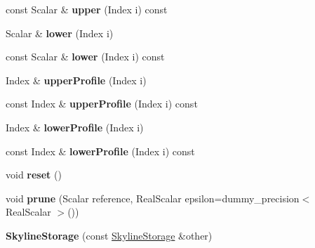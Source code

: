 \begin{DoxyCompactItemize}
const Scalar \& {\bfseries upper} (Index i) const
\item 
\mbox{\label{class_eigen_1_1_skyline_storage_a844f3b6e4223791e73f946aedd8ff04d}} 
Scalar \& {\bfseries lower} (Index i)
\item 
\mbox{\label{class_eigen_1_1_skyline_storage_ad65c2adb1faa0647e7874933f9a5e4b8}} 
const Scalar \& {\bfseries lower} (Index i) const
\item 
\mbox{\label{class_eigen_1_1_skyline_storage_a113fbc2bef6d7a61235d2fd36894bd5b}} 
Index \& {\bfseries upper\+Profile} (Index i)
\item 
\mbox{\label{class_eigen_1_1_skyline_storage_a395ccb86a4d455d7dc3fcf9513e64454}} 
const Index \& {\bfseries upper\+Profile} (Index i) const
\item 
\mbox{\label{class_eigen_1_1_skyline_storage_a1e9e0fc36cf307cebf3ef4d50bd2d0a5}} 
Index \& {\bfseries lower\+Profile} (Index i)
\item 
\mbox{\label{class_eigen_1_1_skyline_storage_a35c879bb44a9a88706bbff6323b7c61b}} 
const Index \& {\bfseries lower\+Profile} (Index i) const
\item 
\mbox{\label{class_eigen_1_1_skyline_storage_a2cec483a57f255f956f6a42d6bac6b57}} 
void {\bfseries reset} ()
\item 
\mbox{\label{class_eigen_1_1_skyline_storage_a9b7d56e2715fe6db7a10b9f151a98bbe}} 
void {\bfseries prune} (Scalar reference, Real\+Scalar epsilon=dummy\+\_\+precision$<$ Real\+Scalar $>$())
\item 
\mbox{\label{class_eigen_1_1_skyline_storage_a3c14a6c60c59bce3651ab41049bb4c4f}} 
{\bfseries Skyline\+Storage} (const \hyperlink{class_eigen_1_1_skyline_storage}{Skyline\+Storage} \&other)
\item 
\mbox{\label{class_eigen_1_1_skyline_storage_a7738010c4f6de76370ec7796ed06c7d1}} 

\end{DoxyCompactItemize}
